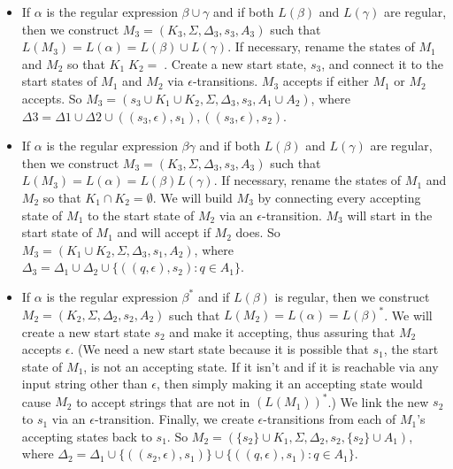 \documentclass{article}
\begin{document}
\begin{itemize}

\item If $\alpha$ is the regular expression $\beta \cup \gamma$ and if both $L(\beta)$ and $L(\gamma)$ are regular,
then we construct $M_3 = (K_3, \Sigma, \Delta_3, s_3, A_3)$ such that $L(M_3) = L(\alpha) = L(\beta) \cup L(\gamma)$. If necessary, rename the states of $M_1$ and $M_2$ so that $K_1  K_2 = $. Create
a new start state, $s_3$, and connect it to the start states of $M_1$ and $M_2$ via
$\epsilon$-transitions. $M_3$ accepts if either $M_1$ or $M_2$ accepts. So $M_3 = ({s_3} \cup K_1 \cup K_2, \Sigma, \Delta_3, s_3, A_1 \cup A_2)$, where $\Delta3 = \Delta1 \cup \Delta2 \cup {((s_3, \epsilon), s_1), ((s_3, \epsilon), s_2)}$.

\item If $\alpha$ is the regular expression $\beta\gamma$ and if both $L(\beta)$ and $L(\gamma)$ are regular, then
we construct $M_3 = (K_3, \Sigma, \Delta_3, s_3, A_3)$ such that $L(M_3) = L(\alpha) = L(\beta) L(\gamma)$. If
necessary, rename the states of $M_1$ and $M_2$ so that $K_1 \cap K_2 = \emptyset$. We will build $M_3$
by connecting every accepting state of $M_1$ to the start state of $M_2$ via an
$\epsilon$-transition. $M_3$ will start in the start state of $M_1$ and will accept if $M_2$
does. So $M_3 = (K_1 \cup K_2, \Sigma, \Delta_3, s_1, A_2)$, where $\Delta_3 = \Delta_1 \cup \Delta_2 \cup \{((q, \epsilon), s_2) : q
\in A_1\}$.

\item If $\alpha$ is the regular expression $\beta^*$ and if $L(\beta)$ is regular, then we construct
$M_2 = (K_2, \Sigma, \Delta_2, s_2, A_2)$ such that $L(M_2) = L(\alpha) = L(\beta)^*$. We will create a new
start state $s_2$ and make it accepting, thus assuring that $M_2$ accepts $\epsilon$. (We need
a new start state because it is possible that $s_1$, the start state of $M_1$, is not
an accepting state. If it isn't and if it is reachable via any input string
other than $\epsilon$, then simply making it an accepting state would cause $M_2$ to accept
strings that are not in $(L(M_1))^*$.) We link the new $s_2$ to $s_1$ via an
$\epsilon$-transition. Finally, we create $\epsilon$-transitions from each of $M_1$’s accepting
states back to $s_1$. So $M_2 = (\{s_2\} \cup K_1, \Sigma, \Delta_2, s_2, \{s_2\} \cup A_1)$, where $\Delta_2 = \Delta_1 \cup
\{((s_2, \epsilon), s_1)\} \cup \{((q, \epsilon), s_1) : q \in A_1\}$. 

\end{itemize}
\end{document}
